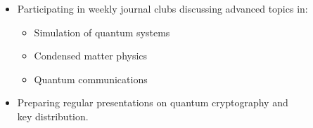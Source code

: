 

\begin{itemize}
    \item Participating in weekly journal clubs discussing advanced topics in:
    
    \begin{itemize}
        \item Simulation of quantum systems
        \item Condensed matter physics
        \item Quantum communications
    \end{itemize}
    
    \item Preparing regular presentations on quantum cryptography and \\key distribution.
\end{itemize}
